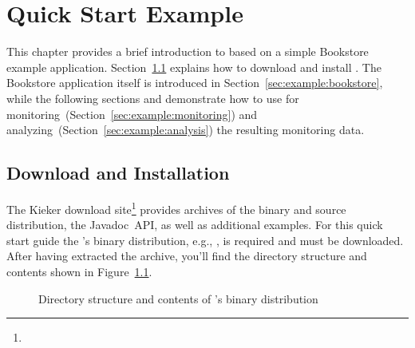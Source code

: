 % 


\chapter{Quick Start Example}\label{chap:example}

This chapter provides a brief introduction to \Kieker{} based on a simple %
Bookstore example application. Section~\ref{sec:example:downloadInstall} %
explains how to download and install \Kieker{}. The Bookstore application itself %
is introduced in Section~\ref{sec:example:bookstore}, while the following %
sections and demonstrate %
how to use \Kieker{} for monitoring~(Section~\ref{sec:example:monitoring}) and %
analyzing~(Section~\ref{sec:example:analysis}) the resulting monitoring data. %

\section{Download and Installation}\label{sec:example:downloadInstall}

The Kieker download site\footnote{\KiekerDownloadURL{}} provides archives %
of the binary and source distribution, the Javadoc~API, as well %
as additional examples. %
For this quick start guide the \Kieker{}'s binary distribution, e.g., %
\file{\binaryFileForDownload}, is required and must be downloaded. %
After having extracted the archive, you'll find the directory structure and %
contents shown in Figure~\ref{fig:binary-layout}.

\begin{figure}%
\begin{graybox}
\end{graybox}
\caption{Directory structure and contents of \Kieker{}'s binary distribution}
\label{fig:binary-layout}
\end{figure}

